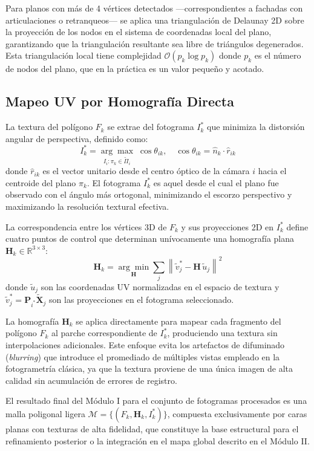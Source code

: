 Para planos con más de 4 vértices detectados —correspondientes a fachadas con articulaciones o retranqueos— se aplica una triangulación de Delaunay 2D sobre la proyección de los nodos en el sistema de coordenadas local del plano, garantizando que la triangulación resultante sea libre de triángulos degenerados. Esta triangulación local tiene complejidad $\mathcal{O}(p_k \log p_k)$ donde $p_k$ es el número de nodos del plano, que en la práctica es un valor pequeño y acotado.
 
\subsection{Mapeo UV por Homografía Directa}
 
La textura del polígono $F_k$ se extrae del fotograma $I^*_k$ que minimiza la distorsión angular de perspectiva, definido como:
\begin{equation}
    I^*_k = \underset{I_i : \pi_k \in \tilde{\Pi}_i}{\arg\max} \;\cos\theta_{ik}, \quad \cos\theta_{ik} = \hat{n}_k \cdot \hat{r}_{ik}
\end{equation}
donde $\hat{r}_{ik}$ es el vector unitario desde el centro óptico de la cámara $i$ hacia el centroide del plano $\pi_k$. El fotograma $I^*_k$ es aquel desde el cual el plano fue observado con el ángulo más ortogonal, minimizando el escorzo perspectivo y maximizando la resolución textural efectiva.
 
La correspondencia entre los vértices 3D de $F_k$ y sus proyecciones 2D en $I^*_k$ define cuatro puntos de control que determinan unívocamente una homografía plana $\mathbf{H}_k \in \mathbb{R}^{3\times 3}$:
\begin{equation}
    \mathbf{H}_k = \underset{\mathbf{H}}{\arg\min} \sum_{j} \left\| \tilde{v}_j^* - \mathbf{H}\, \tilde{u}_j \right\|^2
\end{equation}
donde $\tilde{u}_j$ son las coordenadas UV normalizadas en el espacio de textura y $\tilde{v}_j^* = \mathbf{P}_{i^*} \tilde{\mathbf{X}}_j$ son las proyecciones en el fotograma seleccionado.
 
La homografía $\mathbf{H}_k$ se aplica directamente para mapear cada fragmento del polígono $F_k$ al parche correspondiente de $I^*_k$, produciendo una textura sin interpolaciones adicionales. Este enfoque evita los artefactos de difuminado (\textit{blurring}) que introduce el promediado de múltiples vistas empleado en la fotogrametría clásica, ya que la textura proviene de una única imagen de alta calidad sin acumulación de errores de registro.
 
El resultado final del Módulo I para el conjunto de fotogramas procesados es una malla poligonal ligera $\mathcal{M} = \{(F_k, \mathbf{H}_k, I^*_k)\}$, compuesta exclusivamente por caras planas con texturas de alta fidelidad, que constituye la base estructural para el refinamiento posterior o la integración en el mapa global descrito en el Módulo II.
 
